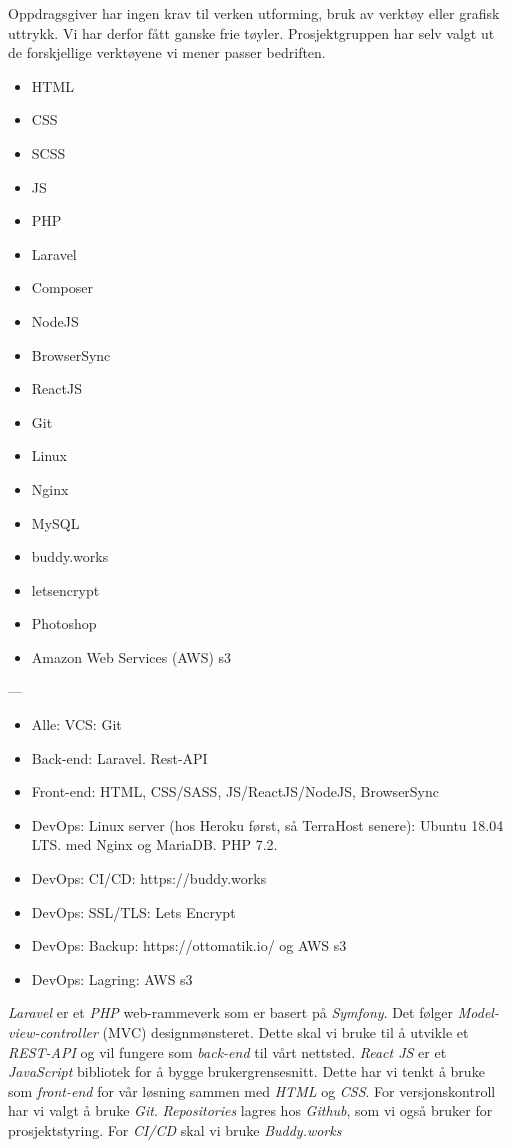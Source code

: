 \documentclass[11pt,a4paper]{report}
\begin{document}
Oppdragsgiver har ingen krav til verken utforming, bruk av verktøy eller grafisk uttrykk. Vi har derfor fått ganske frie tøyler. Prosjektgruppen har selv valgt ut de forskjellige verktøyene vi mener passer bedriften.

\begin{itemize}
\item HTML
\item CSS
\item SCSS
\item JS
\item PHP
\item Laravel
\item Composer
\item NodeJS
\item BrowserSync
\item ReactJS
\item Git
\item Linux
\item Nginx
\item MySQL
\item buddy.works
\item letsencrypt
\item Photoshop
\item Amazon Web Services (AWS) s3 
\end{itemize}

---

\begin{itemize}
\item Alle: VCS: Git
\item Back-end: Laravel. Rest-API
\item Front-end: HTML, CSS/SASS, JS/ReactJS/NodeJS, BrowserSync
\item DevOps: Linux server (hos Heroku først, så TerraHost senere): Ubuntu 18.04 LTS. med Nginx og MariaDB. PHP 7.2.
\item DevOps: CI/CD: https://buddy.works
\item DevOps: SSL/TLS: Lets Encrypt
\item DevOps: Backup: https://ottomatik.io/ og AWS s3
\item DevOps: Lagring: AWS s3
\end{itemize}

\textit{Laravel} er et \textit{PHP} web-rammeverk som er basert på \textit{Symfony}. Det følger \textit{Model-view-controller} (MVC) designmønsteret. Dette skal vi bruke til å utvikle et \textit{REST-API} og vil fungere som \textit{back-end} til vårt nettsted.
\textit{React JS} er et \textit{JavaScript} bibliotek for å bygge brukergrensesnitt. Dette har vi tenkt å bruke som \textit{front-end} for vår løsning sammen med \textit{HTML} og \textit{CSS}.
For versjonskontroll har vi valgt å bruke \textit{Git}.
\textit{Repositories} lagres hos \textit{Github}, som vi også bruker for prosjektstyring. For  \textit{CI/CD} skal vi bruke \textit{Buddy.works}
\end{document}
